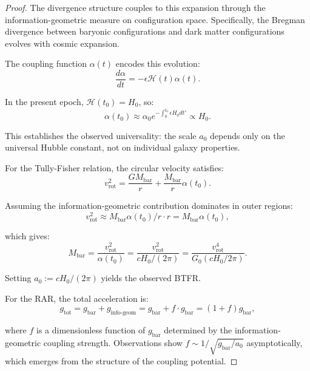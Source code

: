 \begin{theorem}
\begin{proof}
The divergence structure couples to this expansion through the information-geometric measure on configuration space. Specifically, the Bregman divergence between baryonic configurations and dark matter configurations evolves with cosmic expansion.

The coupling function $\alpha(t)$ encodes this evolution:
\begin{equation}
\frac{d\alpha}{dt} = -\epsilon \mathcal{H}(t) \alpha(t).
\end{equation}

In the present epoch, $\mathcal{H}(t_0) = H_0$, so:
\begin{equation}
\alpha(t_0) \approx \alpha_0 e^{-\int_0^{t_0} \epsilon H_0 dt'} \propto H_0.
\end{equation}

This establishes the observed universality: the scale $a_0$ depends only on the universal Hubble constant, not on individual galaxy properties.

For the Tully-Fisher relation, the circular velocity satisfies:
\begin{equation}
v_{\text{rot}}^2 = \frac{GM_{\text{bar}}}{r} + \frac{M_{\text{bar}}}{r} \alpha(t_0).
\end{equation}

Assuming the information-geometric contribution dominates in outer regions:
\begin{equation}
v_{\text{rot}}^2 \approx M_{\text{bar}} \alpha(t_0) / r \cdot r = M_{\text{bar}} \alpha(t_0),
\end{equation}

which gives:
\begin{equation}
M_{\text{bar}} = \frac{v_{\text{rot}}^2}{\alpha(t_0)} = \frac{v_{\text{rot}}^2}{c H_0 / (2\pi)} = \frac{v_{\text{rot}}^4}{G_0 (c H_0 / 2\pi)}.
\end{equation}

Setting $a_0 := c H_0 / (2\pi)$ yields the observed BTFR.

For the RAR, the total acceleration is:
\begin{equation}
g_{\text{tot}} = g_{\text{bar}} + g_{\text{info-geom}} = g_{\text{bar}} + f \cdot g_{\text{bar}} = (1 + f) g_{\text{bar}},
\end{equation}

where $f$ is a dimensionless function of $g_{\text{bar}}$ determined by the information-geometric coupling strength. Observations show $f \sim 1/\sqrt{g_{\text{bar}}/a_0}$ asymptotically, which emerges from the structure of the coupling potential.

\end{proof}

\end{theorem}

